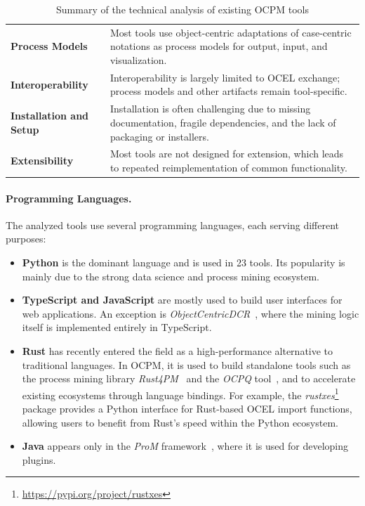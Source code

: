 \begin{table}[H]
\begin{tabularx}{\linewidth}{lX}
		\textbf{Process Models}         & Most tools use object-centric adaptations of case-centric notations as process models for output, input, and visualization.    \\
		\textbf{Interoperability}       & Interoperability is largely limited to OCEL exchange; process models and other artifacts remain tool-specific.                 \\
		\textbf{Installation and Setup} & Installation is often challenging due to missing documentation, fragile dependencies, and the lack of packaging or installers. \\
		\textbf{Extensibility}          & Most tools are not designed for extension, which leads to repeated reimplementation of common functionality.                   \\
		\bottomrule
	\end{tabularx}
	\caption{Summary of the technical analysis of existing OCPM tools}
	\label{tab:tech-analysis-tools-summary}
\end{table}

\paragraph{Programming Languages.}

The analyzed tools use several programming languages, each serving different purposes:

\begin{itemize}
	\item \textbf{Python} is the dominant language and is used in 23 tools. Its popularity is mainly due to the strong data science and process mining ecosystem.

	\item \textbf{TypeScript and JavaScript} are mostly used to build user interfaces for web applications. An exception is \textit{ObjectCentricDCR}~\cite{ocdm}, where the mining logic itself is implemented entirely in TypeScript.

	\item \textbf{Rust} has recently entered the field as a high-performance alternative to traditional languages. In OCPM, it is used to build standalone tools such as the process mining library \textit{Rust4PM}~\cite{rust4pm} and the \textit{OCPQ} tool~\cite{ocpq}, and to accelerate existing ecosystems through language bindings. For example, the \textit{rustxes}\footnote{\url{https://pypi.org/project/rustxes}} package provides a Python interface for Rust-based OCEL import functions, allowing users to benefit from Rust’s speed within the Python ecosystem.
	\item \textbf{Java} appears only in the \textit{ProM} framework~\cite{ocpm, oclpm,constraintchecking}, where it is used for developing plugins.
\end{itemize}


